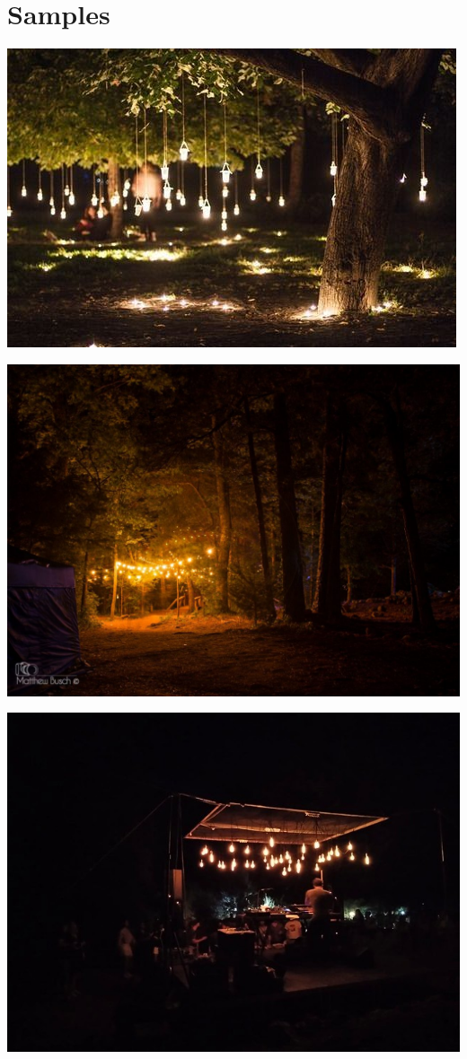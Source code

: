 \documentclass[11pt]{article}
\author{Ivan Nikolic}
\date{\today}
\title{}
\begin{document}
\tableofcontents


\section{Samples}
\label{sec:orga3746e5}

\begin{center}
\includegraphics[width=.9\linewidth]{./samples/3.jpg}
\end{center}
\begin{center}
\includegraphics[width=.9\linewidth]{./samples/4.jpg}
\end{center}
\begin{center}
\includegraphics[width=.9\linewidth]{./samples/5.jpg}
\end{center}
\end{document}
